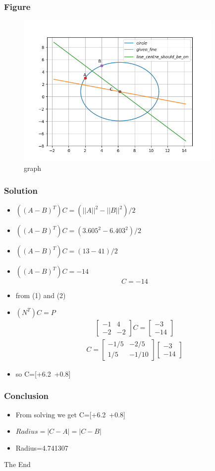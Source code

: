 \documentclass{beamer}
\begin{document}
\begin{frame}
\frametitle{Figure}
\begin{figure}[htp]
\centering
\includegraphics[width=10cm]{figure}
\caption{graph}
\label{fig:graph}
\end{figure}
\end{frame}
\begin{frame}
\frametitle{Solution}
\begin{itemize}
\item $((A-B)^T)C=(||A||^2-||B||^2)/2$        
\item $((A-B)^T)C=(3.605^2-6.403^2)/2$
\item $((A-B)^T)C=(13-41)/2$
\item $((A-B)^T)C=-14$
\begin{equation}
    [-2\ -2]C=-14
\end{equation}
\item from (1) and (2)\\
\item $(N^T)C=P$\\
\begin{gather}
\begin{bmatrix}
    -1 & 4 \\
    -2 & -2 
\end{bmatrix}
C=\begin{bmatrix}
    -3\\
    -14
\end{bmatrix}
\end{gather}
\begin{gather}
C=
\begin{bmatrix}
    -1/5 & -2/5 \\
    1/5 & -1/10 
\end{bmatrix}
\begin{bmatrix}
    -3\\
    -14
\end{bmatrix}
\end{gather}
\item so C=[+6.2\  +0.8]
\end{itemize}
\end{frame}

\begin{frame}
\frametitle{Conclusion}
\begin{itemize}
\item From solving we get C=[+6.2\ +0.8]
\item $Radius=|C-A|=|C-B|$
\item Radius=4.741307
\end{itemize}
\end{frame}


\begin{frame}
\Huge{\centerline{The End}}
\end{frame}
\end{document}
